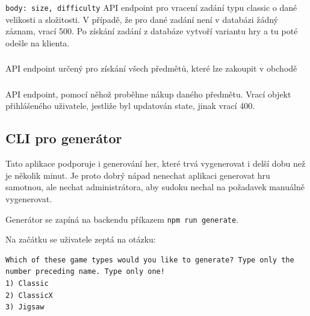 \documentclass[a4paper,oneside,12pt]{report}
\begin{document}
\subsubsection{\color{apigreen}{GET -- /api/games/classic}}
\texttt{body: size, difficulty} 
API endpoint pro vracení zadání typu classic o dané velikosti a složitosti. V případě, že pro dané zadání není v databázi žádný záznam, vrací 500. Po získání zadání z databáze vytvoří variantu hry a tu poté odešle na klienta.

\subsubsection{\color{apigreen}{GET -- /api/games/classicX}}
\subsubsection{\color{apigreen}{GET -- /api/games/jigsaw}}

\subsubsection{\color{apigreen}{GET -- /api/shop/}}
API endpoint určený pro získání všech předmětů, které lze zakoupit v obchodě

\subsubsection{\color{apigreen}{GET -- /api/shop/buy}}
API endpoint, pomocí něhož proběhne nákup daného předmětu. Vrací objekt přihlášeného uživatele, jestliže byl updatován state, jinak vrací 400.

\subsection{CLI pro generátor}
Tato aplikace podporuje i generování her, které trvá vygenerovat i delší dobu než je několik minut. Je proto dobrý nápad nenechat aplikaci generovat hru samotnou, ale nechat administrátora, aby sudoku nechal na požadavek manuálně vygenerovat. 

Generátor se zapíná na backendu příkazem \texttt{npm run generate}. 

Na začátku se uživatele zeptá na otázku: 
\begin{lstlisting}[breaklines, basicstyle=\tiny]
Which of these game types would you like to generate? Type only the number preceding name. Type only one!
1) Classic
2) ClassicX
3) Jigsaw
\end{lstlisting}
\end{document}
